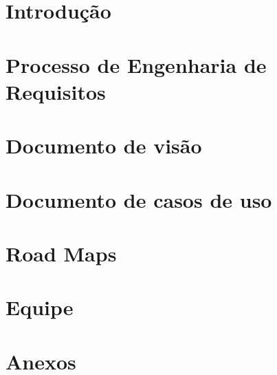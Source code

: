 \section{Introdução} %
\label{sec:introdu_o}
 
\section{Processo de Engenharia de Requisitos}
\label{sec:processo}


% 

\section{Documento de visão}
\label{sec:document_de_visao}


\section{Documento de casos de uso}
\label{sec:documento_de_caso_de_uso}


\section{Road Maps}
\label{sec:road_map}


\section{Equipe} %
\label{sec:equipe}


\section{Anexos}
\label{sec:anexos}


%

%
